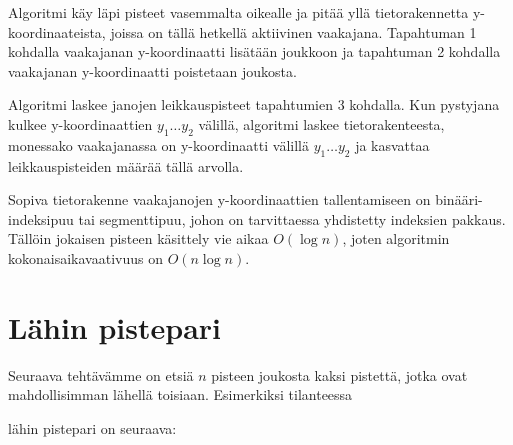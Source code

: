 Algoritmi käy läpi pisteet vasemmalta oikealle
ja pitää yllä tietorakennetta y-koordinaateista,
joissa on tällä hetkellä aktiivinen vaakajana.
Tapahtuman 1 kohdalla vaakajanan y-koordinaatti
lisätään joukkoon ja tapahtuman 2 kohdalla
vaakajanan y-koordinaatti poistetaan joukosta.

Algoritmi laskee janojen leikkauspisteet
tapahtumien 3 kohdalla.
Kun pystyjana kulkee y-koordinaattien
$y_1 \ldots y_2$ välillä,
algoritmi laskee tietorakenteesta,
monessako vaakajanassa on y-koordinaatti
välillä $y_1 \ldots y_2$ ja kasvattaa
leikkauspisteiden määrää tällä arvolla.

Sopiva tietorakenne vaakajanojen y-koordinaattien
tallentamiseen on bi\-nää\-ri-indeksipuu tai segmenttipuu,
johon on tarvittaessa yhdistetty indeksien pakkaus.
Tällöin jokaisen pisteen käsittely
vie aikaa $O(\log n)$, joten algoritmin
kokonaisaikavaativuus on $O(n \log n)$.

\section{Lähin pistepari}


Seuraava tehtävämme on etsiä $n$ pisteen
joukosta kaksi pistettä, jotka ovat
mahdollisimman lähellä toisiaan.
Esimerkiksi tilanteessa
\begin{center}
\end{center}
\begin{samepage}
lähin pistepari on seuraava:
\begin{center}
\end{center}
\end{samepage}

